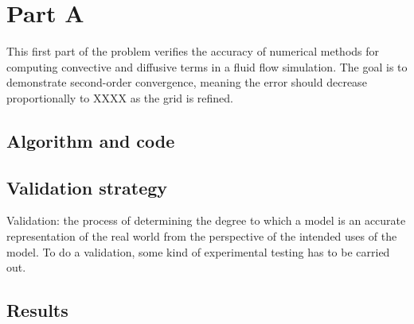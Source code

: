 \section{Part A}

This first part of the problem verifies the accuracy of numerical methods for computing convective and diffusive terms in a fluid flow simulation. The goal is to demonstrate second-order convergence, meaning the error should decrease proportionally to XXXX as the grid is refined.

\subsection{Algorithm and code}



\subsection{Validation strategy}

Validation: the process of determining the degree to which a model is an
accurate representation of the real world from the perspective of the intended
uses of the model.
To do a validation, some kind of experimental testing has to be carried out. 

\subsection{Results}